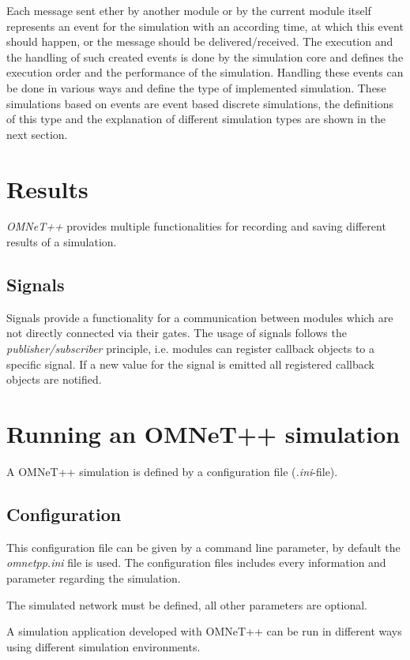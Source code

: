 Each message sent ether by another module or by the current module itself represents an event for the simulation with an according time, at which this event should happen, or the message should be delivered/received.
The execution and the handling of such created events is done by the simulation core and defines the execution order and the performance of the simulation.
Handling these events can be done in various ways and define the type of implemented simulation.
These simulations based on events are event based discrete simulations, the definitions of this type and the explanation of different simulation types are shown in the next section.

\section{Results}
\emph{OMNeT++} provides multiple functionalities for recording and saving different results of a simulation.

\subsection{Signals}
Signals provide a functionality for a communication between modules which are not directly connected via their gates.
The usage of signals follows the \emph{publisher/subscriber} principle, i.e. modules can register callback objects to a specific signal.
If a new value for the signal is emitted all registered callback objects are notified.


\section{Running an OMNeT++ simulation}
A OMNeT++ simulation is defined by a configuration file (\emph{.ini}-file).

\subsection{Configuration}
This configuration file can be given by a command line parameter, by default the \emph{omnetpp.ini} file is used.
The configuration files includes every information and parameter regarding the simulation.

The simulated network must be defined, all other parameters are optional.



A simulation application developed with OMNeT++ can be run in different ways using different simulation environments.

